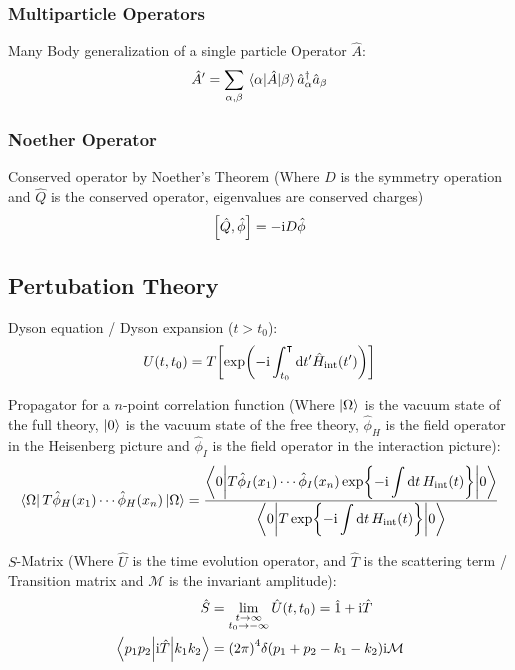 		\subsubsection{Multiparticle Operators}
			Many Body generalization of a single particle Operator $\hat{A}$:
			\begin{equation}
				\hat{A}' = \sum_{\alpha,\beta} \mel{\alpha}{\hat{A}}{\beta} \hat{a}_\alpha^\dagger \hat{a}_\beta
			\end{equation}

		\subsubsection{Noether Operator}
			\noindent
			Conserved operator by Noether's Theorem (Where $D$ is the symmetry operation and $\hat{Q}$ is the conserved operator, \ie eigenvalues are conserved charges)
			\begin{equation}
				\comm{\hat{Q}}{\hat{\phi}} = -\i D\hat{\phi}
			\end{equation}

	\subsection{Pertubation Theory}
		Dyson equation / Dyson expansion ($t > t_0$):
		\begin{equation}
			U(t,t_0) = T \qty[ \exp(-\mathrm{i} \int_{t_0}^\intercal \dd t' \hat{H}_{\mathrm{int}}(t')) ]
		\end{equation}

		\noindent
		Propagator for a $n$-point correlation function (Where $\Ket{\Omega}$ is the vacuum state of the full theory, $\Ket{0}$ is the vacuum state of the free theory, $\hat{\phi}_H$ is the field operator in the Heisenberg picture and $\hat{\phi}_I$ is the field operator in the interaction picture):
		\begin{equation}
			\Bra{\Omega} T \hat{\phi}_H(x_1) \dotsb \hat{\phi}_H(x_n) \Ket{\Omega}
			= \frac{ \mel**{0}{T \hat{\phi}_I(x_1) \dotsb \hat{\phi}_I(x_n) \exp{-\mathrm{i}\displaystyle\int \dd t \, H_{\mathrm{int}}(t)}}{0}}
			{\mel**{0}{T\exp{-\mathrm{i}\displaystyle\int \dd t \, H_{\mathrm{int}}(t)}}{0}}
		\end{equation}

		\noindent
		$S$-Matrix (Where $\hat{U}$ is the time evolution operator, and $\hat{T}$ is the scattering term / Transition matrix and $\mathcal{M}$ is the invariant amplitude):
		\begin{equation}
			\begin{aligned}
				\hat{S} &= \lim_{\substack{t \to\infty\\t_0 \to-\infty}} \hat{U}(t,t_0) = \hat{1} + \mathrm{i} \hat{T} \\
				\mel**{p_{1}p_{2}}{\mathrm{i} \hat{T}}{k_{1}k_{2}} &= \qty(2\pi)^4\delta(p_1 + p_2 - k_1 - k_2) \mathrm{i} \mathcal{M} \\
			\end{aligned}
		\end{equation}

